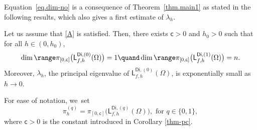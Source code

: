 Equation~\eqref{eq.dim-no} is a consequence of Theorem~\ref{thm.main1} as stated in the following results, which also gives a first estimate of $\lambda_h$.
\begin{corollary}\label{thm-pc}
Let us assume that \ref{A} is satisfied. Then, there exists $\mathsf c>0$ and $h_0>0$ such that for all $h \in (0,h_0)$,
\[
\dim \range \pi_{[0,\mathsf c]} \bigl(\mathsf L^{\mathsf{Di},(0)}_{f,h}(\Omega)\bigr)
=1 \quand \dim \range \pi_{[0,\mathsf c]} \bigl(\mathsf L^{\mathsf{Di},(1)}_{f,h}(\Omega)\bigr) =n.
\]
Moreover, $\lambda_h$, the principal eigenvalue of $\mathsf L^{\mathsf{Di},(0)}_{f,h}(\Omega)$, is exponentially small as $h\to 0$.
\end{corollary}

For ease of notation, we~set
\begin{equation}
\label{eq.proj}
\pi_h^{(q)}= \pi_{[0,\mathsf c]} \bigl(\mathsf L^{\mathsf{Di},(q)}_{f,h}(\Omega)\bigr), \text{ for $q\in \{0,1\}$},
\end{equation}
where $\mathsf c>0$ is the constant introduced in Corollary \ref{thm-pc}.

